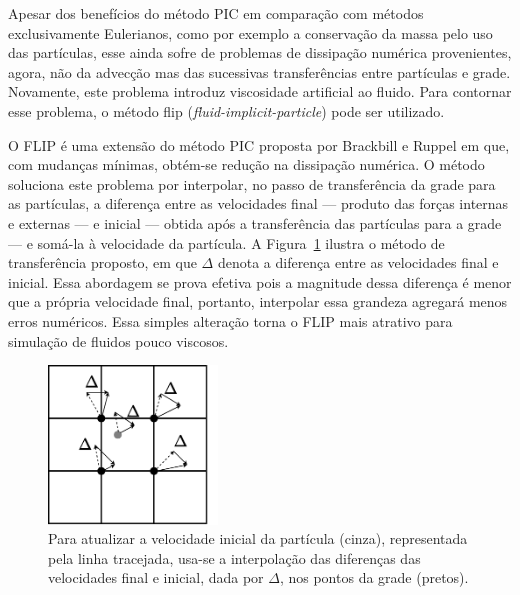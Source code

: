 \documentclass[12pt,a4paper,dvipsnames]{article}
\newcommand{\figref}[1]{Figura~\ref{#1}}
\begin{document}
Apesar dos benefícios do método PIC em comparação com métodos exclusivamente Eulerianos, como por exemplo a conservação da massa pelo uso das partículas, esse ainda sofre de problemas de dissipação numérica provenientes, agora, não da advecção mas das sucessivas transferências entre partículas e grade. Novamente, este problema introduz viscosidade artificial ao fluido. Para contornar esse problema, o método flip (\emph{fluid-implicit-particle}) pode ser utilizado.

O FLIP é uma extensão do método PIC proposta por Brackbill e Ruppel \cite{FLIP} em que, com mudanças mínimas, obtém-se redução na dissipação numérica. O método soluciona este problema por interpolar, no passo de transferência da grade para as partículas, a diferença entre as velocidades final --- produto das forças internas e externas --- e inicial --- obtida após a transferência das partículas para a grade --- e somá-la à velocidade da partícula. A \figref{fig:transfercellparticle} ilustra o método de transferência proposto, em que $\Delta$ denota a diferença entre as velocidades final e inicial. Essa abordagem se prova efetiva pois a magnitude dessa diferença é menor que a própria velocidade final, portanto, interpolar essa grandeza agregará menos erros numéricos. Essa simples alteração torna o FLIP mais atrativo para simulação de fluidos pouco viscosos.

\begin{figure}[ht]
    \centering
    \includegraphics[width=0.4\textwidth]{Grid2Particle.pdf}
    \caption{Para atualizar a velocidade inicial da partícula (cinza), representada pela linha tracejada, usa-se a interpolação das diferenças das velocidades final e inicial, dada por $\Delta$, nos pontos da grade (pretos).}
    \label{fig:transfercellparticle}
\end{figure}

\end{document}
